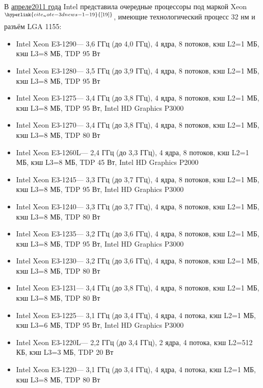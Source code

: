\documentclass[a4paper,11pt]{article}
\begin{document}
В \href{https://ru.wikipedia.org/wiki/%D0%90%D0%BF%D1%80%D0%B5%D0%BB%D1%8C}{апреле}\href{https://ru.wikipedia.org/wiki/2011_%D0%B3%D0%BE%D0%B4}{2011 года} Intel представила очередные процессоры под маркой Xeon$^\hyperlink{cite_note-3dnews-1-19}{[19]}$, имеющие технологический процесс 32 нм и разъём LGA 1155:
\begin{itemize}
	\item Intel Xeon E3-1290\nolinebreak— 3,6 ГГц (до 4,0 ГГц), 4 ядра, 8 потоков, кэш L2=1 МБ, кэш L3=8 МБ, TDP 95 Вт
	\item Intel Xeon E3-1280\nolinebreak— 3,5 ГГц (до 3,9 ГГц), 4 ядра, 8 потоков, кэш L2=1 МБ, кэш L3=8 МБ, TDP 95 Вт
	\item Intel Xeon E3-1275\nolinebreak— 3,4 ГГц (до 3,8 ГГц), 4 ядра, 8 потоков, кэш L2=1 МБ, кэш L3=8 МБ, TDP 95 Вт, Intel HD Graphics P3000
	\item Intel Xeon E3-1270\nolinebreak— 3,4 ГГц (до 3,8 ГГц), 4 ядра, 8 потоков, кэш L2=1 МБ, кэш L3=8 МБ, TDP 80 Вт
	\item Intel Xeon E3-1260L\nolinebreak— 2,4 ГГц (до 3,3 ГГц), 4 ядра, 8 потоков, кэш L2=1 МБ, кэш L3=8 МБ, TDP 45 Вт, Intel HD Graphics P2000
	\item Intel Xeon E3-1245\nolinebreak— 3,3 ГГц (до 3,7 ГГц), 4 ядра, 8 потоков, кэш L2=1 МБ, кэш L3=8 МБ, TDP 95 Вт, Intel HD Graphics P3000
	\item Intel Xeon E3-1240\nolinebreak— 3,3 ГГц (до 3,7 ГГц), 4 ядра, 8 потоков, кэш L2=1 МБ, кэш L3=8 МБ, TDP 80 Вт
	\item Intel Xeon E3-1235\nolinebreak— 3,2 ГГц (до 3,6 ГГц), 4 ядра, 8 потоков, кэш L2=1 МБ, кэш L3=8 МБ, TDP 95 Вт, Intel HD Graphics P3000
	\item Intel Xeon E3-1230\nolinebreak— 3,2 ГГц (до 3,6 ГГц), 4 ядра, 8 потоков, кэш L2=1 МБ, кэш L3=8 МБ, TDP 80 Вт
	\item Intel Xeon E3-1231\nolinebreak— 3,4 ГГц (до 3,8 ГГц), 4 ядра, 8 потоков, кэш L2=1 МБ, кэш L3=8 МБ, TDP 80 Вт
	\item Intel Xeon E3-1225\nolinebreak— 3,1 ГГц (до 3,4 ГГц), 4 ядра, 4 потока, кэш L2=1 МБ, кэш L3=6 МБ, TDP 95 Вт, Intel HD Graphics P3000
	\item Intel Xeon E3-1220L\nolinebreak— 2,2 ГГц (до 3,4 ГГц), 2 ядра, 4 потока, кэш L2=512 КБ, кэш L3=3 МБ, TDP 20 Вт
	\item Intel Xeon E3-1220\nolinebreak— 3,1 ГГц (до 3,4 ГГц), 4 ядра, 4 потока, кэш L2=1 МБ, кэш L3=8 МБ, TDP 80 Вт
\end{itemize}
\end{document}
